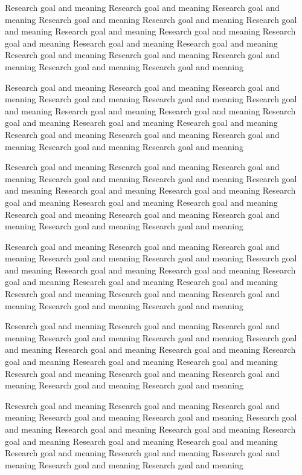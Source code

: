\documentclass[12pt]{article} %
\begin{document}
Research goal and meaning Research goal and meaning Research goal and meaning Research goal and meaning
Research goal and meaning Research goal and meaning Research goal and meaning Research goal and meaning
Research goal and meaning Research goal and meaning Research goal and meaning Research goal and meaning
Research goal and meaning Research goal and meaning Research goal and meaning Research goal and meaning

Research goal and meaning Research goal and meaning Research goal and meaning Research goal and meaning
Research goal and meaning Research goal and meaning Research goal and meaning Research goal and meaning
Research goal and meaning Research goal and meaning Research goal and meaning Research goal and meaning
Research goal and meaning Research goal and meaning Research goal and meaning Research goal and meaning

Research goal and meaning Research goal and meaning Research goal and meaning Research goal and meaning
Research goal and meaning Research goal and meaning Research goal and meaning Research goal and meaning
Research goal and meaning Research goal and meaning Research goal and meaning Research goal and meaning
Research goal and meaning Research goal and meaning Research goal and meaning Research goal and meaning

Research goal and meaning Research goal and meaning Research goal and meaning Research goal and meaning
Research goal and meaning Research goal and meaning Research goal and meaning Research goal and meaning
Research goal and meaning Research goal and meaning Research goal and meaning Research goal and meaning
Research goal and meaning Research goal and meaning Research goal and meaning Research goal and meaning

Research goal and meaning Research goal and meaning Research goal and meaning Research goal and meaning
Research goal and meaning Research goal and meaning Research goal and meaning Research goal and meaning
Research goal and meaning Research goal and meaning Research goal and meaning Research goal and meaning
Research goal and meaning Research goal and meaning Research goal and meaning Research goal and meaning

Research goal and meaning Research goal and meaning Research goal and meaning Research goal and meaning
Research goal and meaning Research goal and meaning Research goal and meaning Research goal and meaning
Research goal and meaning Research goal and meaning Research goal and meaning Research goal and meaning
Research goal and meaning Research goal and meaning Research goal and meaning Research goal and meaning
\end{document}
